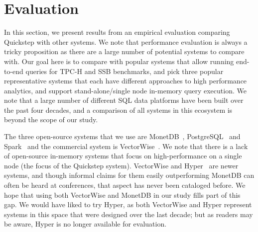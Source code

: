 
\section{Evaluation} \label{evaluation}
In this section, we present results from an empirical evaluation comparing Quickstep with other systems. We note that performance evaluation is always a tricky proposition as there are a large number of potential systems to compare with. Our goal here is to compare with popular systems that allow running end-to-end queries for TPC-H and SSB benchmarks, and pick three popular representative systems that each have different approaches to high performance analytics, and support stand-alone/single node in-memory query execution. We note that a large number of different SQL data platforms have been built over the past four decades, and a comparison of all systems in this ecosystem is beyond the scope of our study.


The three open-source systems that we use are MonetDB~\cite{monetdb}, PostgreSQL~\cite{postgres} and Spark~\cite{Spark, SparkSQL} and the commercial system is VectorWise~\cite{vectorwise}. 
We note that there is a lack of open-source in-memory systems that focus on high-performance on a single node (the focus of the Quickstep system). 
VectorWise and Hyper~\cite{hyper} are newer systems, and though informal claims for them easily outperforming MonetDB can often be heard at conferences, that aspect has never been cataloged before. 
We hope that using both VectorWise  and MonetDB in our study fills part of this gap. 
We would have liked to try Hyper, as both VectorWise and Hyper represent systems in this space that were designed over the last decade; but as readers may be aware, Hyper is no longer available for evaluation.


